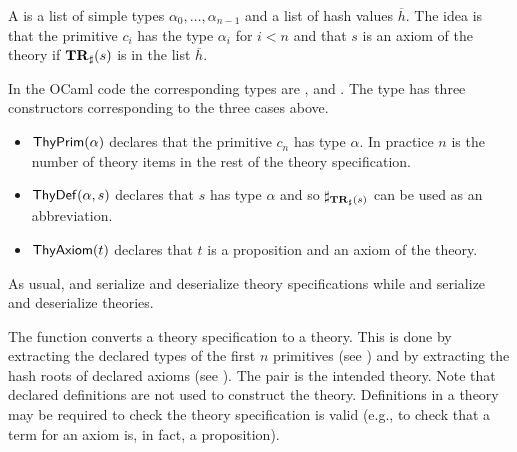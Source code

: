 A {} is a list of simple types $\alpha_0,\ldots,\alpha_{n-1}$
and a list of hash values $\overline{h}$.
The idea is that the primitive $c_i$ has the type $\alpha_i$ for $i<n$
and that $s$ is an axiom of the theory if $\mathbf{TR}_{\sharp}(s)$ is in the list $\overline{h}$.

In the OCaml code the corresponding types are
{}, {} and
{}.
The type {} has three constructors corresponding to the three cases above.
\begin{itemize}
\item $\mbox{\constr{ThyPrim}}(\alpha)$ declares that the primitive $c_n$ has type $\alpha$.
In practice $n$ is the number of {} theory items in the rest of the
theory specification.
\item $\mbox{\constr{ThyDef}}(\alpha,s)$ declares that $s$ has type $\alpha$ and so $\mathbf{\sharp}_{\mathbf{TR}_{\sharp}(s)}$ can
be used as an abbreviation.
\item $\mbox{\constr{ThyAxiom}}(t)$ declares that $t$ is a proposition and an axiom of the theory.
\end{itemize}
As usual, 
{} and {} serialize and deserialize theory specifications
while
{} and {} serialize and deserialize theories.


The function {} converts a theory specification to a theory.
This is done by extracting the declared types of the first $n$ primitives (see {})
and by extracting the hash roots of declared axioms (see {}).
The pair is the intended theory. Note that declared definitions are not used to construct the theory.
Definitions in a theory may be required to check the theory specification is valid (e.g.,
to check that a term for an axiom is, in fact, a proposition).

